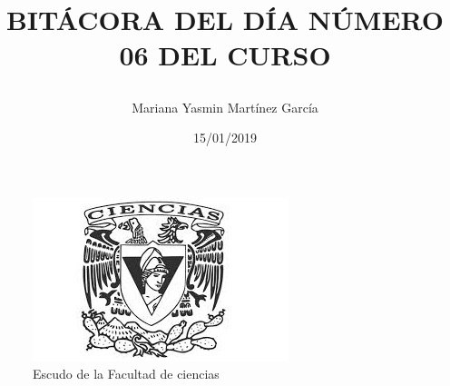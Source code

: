 \documentclass{article}
\title{\Huge\item\color{blue}\textbf{BITÁCORA DEL DÍA NÚMERO 06 DEL CURSO}}
\author{\Large Mariana Yasmin Martínez García}
\date{\Large 15/01/2019}
\begin{document}
\begin{figure}[t]
	\centering
	\includegraphics[width=0.4\linewidth]{Imagenes/1}
	\caption{Escudo de la Facultad de ciencias}
	\label{fig:1}
\end{figure}
	\maketitle
		
	\newpage
	
\end{document}
